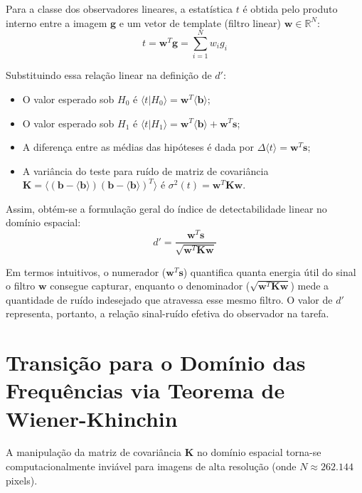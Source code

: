 Para a classe dos observadores lineares, a estatística $t$ é obtida pelo produto interno entre a imagem $\mathbf{g}$ e um vetor de template (filtro linear) $\mathbf{w} \in \mathbb{R}^N$:
\begin{equation}
  t = \mathbf{w}^T \mathbf{g} = \sum_{i=1}^N w_i g_i
  \label{eq:template_linear}
\end{equation}

Substituindo essa relação linear na definição de $d'$:
\begin{itemize}
  \item O valor esperado sob $H_0$ é $\langle t | H_0 \rangle = \mathbf{w}^T \langle \mathbf{b} \rangle$;
  \item O valor esperado sob $H_1$ é $\langle t | H_1 \rangle = \mathbf{w}^T \langle \mathbf{b} \rangle + \mathbf{w}^T \mathbf{s}$;
  \item A diferença entre as médias das hipóteses é dada por $\Delta \langle t \rangle = \mathbf{w}^T \mathbf{s}$;
  \item A variância do teste para ruído de matriz de covariância $\mathbf{K} = \langle (\mathbf{b} - \langle \mathbf{b} \rangle)(\mathbf{b} - \langle \mathbf{b} \rangle)^T \rangle$ é $\sigma^2(t) = \mathbf{w}^T \mathbf{K} \mathbf{w}$.
\end{itemize}

Assim, obtém-se a formulação geral do índice de detectabilidade linear no domínio espacial:
\begin{equation}
  d' = \frac{\mathbf{w}^T \mathbf{s}}{\sqrt{\mathbf{w}^T \mathbf{K} \mathbf{w}}}
  \label{eq:dprime_linear_espacial}
\end{equation}

Em termos intuitivos, o numerador ($\mathbf{w}^T \mathbf{s}$) quantifica quanta energia útil do sinal o filtro $\mathbf{w}$ consegue capturar, enquanto o denominador ($\sqrt{\mathbf{w}^T \mathbf{K} \mathbf{w}}$) mede a quantidade de ruído indesejado que atravessa esse mesmo filtro. O valor de $d'$ representa, portanto, a relação sinal-ruído efetiva do observador na tarefa.

\section{Transição para o Domínio das Frequências via Teorema de Wiener-Khinchin}
\label{sec:wiener_khinchin}

A manipulação da matriz de covariância $\mathbf{K}$ no domínio espacial torna-se computacionalmente inviável para imagens de alta resolução (onde $N \approx 262.144$ pixels).

